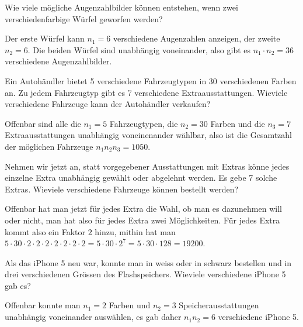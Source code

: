 \begin{beispiele}
\item Wie viele mögliche Augenzahlbilder können entstehen, wenn zwei
verschiedenfarbige Würfel geworfen werden?

\begin{loesung}
Der erste Würfel kann $n_1=6$ verschiedene Augenzahlen anzeigen,
der zweite $n_2=6$.
Die beiden Würfel sind unabhängig voneinander,
also gibt es $n_1\cdot n_2=36$ verschiedene Augenzahlbilder.
\end{loesung}


\item Ein Autohändler bietet 5 verschiedene Fahrzeugtypen in 30
verschiedenen Farben an.
Zu jedem Fahrzeugtyp gibt es 7 verschiedene Extraausstattungen.
Wieviele verschiedene Fahrzeuge kann der Autohändler verkaufen?

\begin{loesung}
Offenbar sind alle die $n_1=5$ Fahrzeugtypen, die $n_2=30$ Farben
und die $n_3=7$ Extraausstattungen unabhängig voneinenander wählbar, also ist
die Gesamtzahl der möglichen Fahrzeuge $n_1n_2n_3=1050$.
\end{loesung}

\item Nehmen wir jetzt an, statt vorgegebener Ausstattungen mit
Extras könne jedes einzelne Extra unabhängig gewählt oder
abgelehnt werden.
Es gebe 7 solche Extras.
Wieviele verschiedene Fahrzeuge können bestellt werden?

\begin{loesung}
Offenbar hat man jetzt für jedes Extra die Wahl, ob man es dazunehmen
will oder nicht, man hat also für jedes Extra zwei Möglichkeiten.
Für jedes Extra kommt also ein Faktor $2$ hinzu, mithin hat man
$5\cdot 30
\cdot 2
\cdot 2
\cdot 2
\cdot 2
\cdot 2
\cdot 2
\cdot 2
=5\cdot 30\cdot 2^7=5\cdot 30 \cdot 128=19200$.
\end{loesung}

\item Als das iPhone 5 neu war, konnte man in weiss oder in schwarz
bestellen und in drei verschiedenen
Grössen des Flashspeichers.
Wieviele verschiedene iPhone 5 gab es?

\begin{loesung}
Offenbar konnte man $n_1=2$ Farben und $n_2=3$ Speicherausstattungen
unabhängig voneinander auswäh\-len, es gab
daher $n_1n_2=6$ verschiedene iPhone 5.
\end{loesung}

\end{beispiele}

